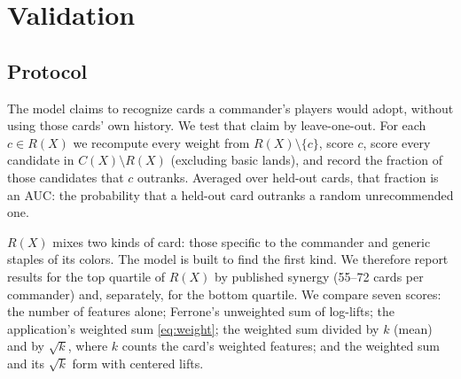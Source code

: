 \documentclass[11pt]{article}
\theoremstyle{remark}
\begin{document}
\section{Validation}\label{sec:val}
\subsection{Protocol}
\noindent The model claims to recognize cards a commander's players would adopt,
without using those cards' own history. We test that claim by leave-one-out. For
each $c\in R(X)$ we recompute every weight from $R(X)\setminus\{c\}$, score $c$,
score every candidate in $C(X)\setminus R(X)$ (excluding basic lands), and record
the fraction of those candidates that $c$ outranks. Averaged over held-out cards,
that fraction is an AUC: the probability that a held-out card outranks a random
unrecommended one.

$R(X)$ mixes two kinds of card: those specific to the commander and generic
staples of its colors. The model is built to find the first kind. We therefore
report results for the top quartile of $R(X)$ by published synergy (55--72 cards
per commander) and, separately, for the bottom quartile. We compare seven scores:
the number of features alone; Ferrone's unweighted sum of log-lifts; the
application's weighted sum \eqref{eq:weight}; the weighted sum divided by $k$
(mean) and by $\sqrt{k}$, where $k$ counts the card's weighted features; and the
weighted sum and its $\sqrt{k}$ form with centered lifts.
\end{document}
